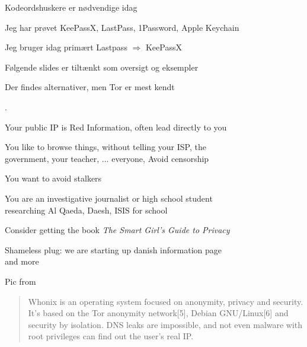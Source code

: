 \documentclass[18pt,landscape,a4paper,footrule]{foils}
\begin{document}


\begin{list1}
\item Kodeordshuskere er nødvendige idag
\item Jeg har prøvet KeePassX, LastPass, 1Password, Apple Keychain
\item Jeg bruger idag primært Lastpass $\Longrightarrow$ KeePassX
\end{list1}


Følgende slides er tiltænkt som oversigt og eksempler



\centerline{}

\vskip 2cm
\centerline{Der findes alternativer, men Tor er mest kendt}


.

\begin{list2}
\item Your public IP is {\color{red}Red Information}, often lead directly to you
\item You like to browse things, without telling your ISP, the\\
government, your teacher, ... everyone, Avoid censorship
\item You want to avoid stalkers
\item You are an investigative journalist or high school student\\
researching Al Qaeda, Daesh, ISIS for school
\item Consider getting the book \emph{The Smart Girl's Guide to Privacy}\\ 
\end{list2}

Shameless plug: we are starting up danish information page\\
and more 

Pic from 



\begin{quote}
Whonix is an operating system focused on anonymity, privacy and security. It's based on the Tor anonymity network[5], Debian GNU/Linux[6] and security by isolation. DNS leaks are impossible, and not even malware with root privileges can find out the user's real IP.
\end{quote}
\end{document}
